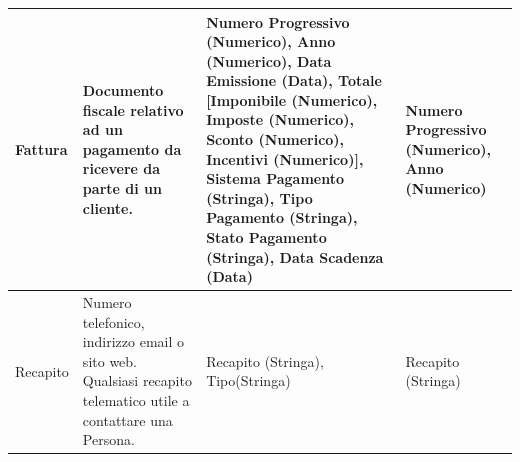 {\begin{longtable}{| p{2cm} | p{4cm} | p{4cm} | p{2cm} |}
				Fattura &
				Documento fiscale relativo ad un pagamento da ricevere da parte di un cliente. &
				Numero Progressivo (Numerico), Anno (Numerico), Data Emissione (Data), Totale [Imponibile (Numerico), Imposte (Numerico), Sconto (Numerico), Incentivi (Numerico)], Sistema Pagamento (Stringa), Tipo Pagamento (Stringa), Stato Pagamento (Stringa), Data Scadenza (Data) &
				Numero Progressivo (Numerico), Anno (Numerico)
				\\ \hline
				
				Recapito &
				Numero telefonico, indirizzo email o sito web. Qualsiasi recapito telematico utile a contattare una Persona. &
				Recapito (Stringa), Tipo(Stringa) &
				Recapito (Stringa)
				\\ \hline
				
			\end{longtable}
			}

